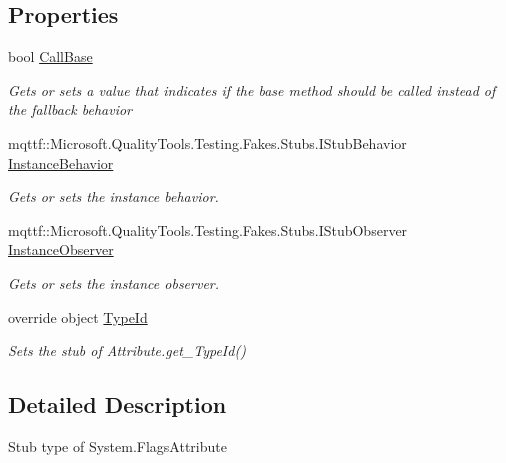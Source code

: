 \subsection*{Properties}
\begin{DoxyCompactItemize}
\item 
bool \hyperlink{class_system_1_1_fakes_1_1_stub_flags_attribute_aa4cd676c172e42dd1aff52ae63601b5b}{Call\-Base}
\begin{DoxyCompactList}\small\item\em Gets or sets a value that indicates if the base method should be called instead of the fallback behavior\end{DoxyCompactList}\item 
mqttf\-::\-Microsoft.\-Quality\-Tools.\-Testing.\-Fakes.\-Stubs.\-I\-Stub\-Behavior \hyperlink{class_system_1_1_fakes_1_1_stub_flags_attribute_a53c4a9b619856a3a7f818fd880e8b960}{Instance\-Behavior}
\begin{DoxyCompactList}\small\item\em Gets or sets the instance behavior.\end{DoxyCompactList}\item 
mqttf\-::\-Microsoft.\-Quality\-Tools.\-Testing.\-Fakes.\-Stubs.\-I\-Stub\-Observer \hyperlink{class_system_1_1_fakes_1_1_stub_flags_attribute_a7fe96b9b689597e6b65ca9a1de640c67}{Instance\-Observer}
\begin{DoxyCompactList}\small\item\em Gets or sets the instance observer.\end{DoxyCompactList}\item 
override object \hyperlink{class_system_1_1_fakes_1_1_stub_flags_attribute_a10af025c593a7452b4ac34199dbb32a0}{Type\-Id}
\begin{DoxyCompactList}\small\item\em Sets the stub of Attribute.\-get\-\_\-\-Type\-Id()\end{DoxyCompactList}\end{DoxyCompactItemize}


\subsection{Detailed Description}
Stub type of System.\-Flags\-Attribute



